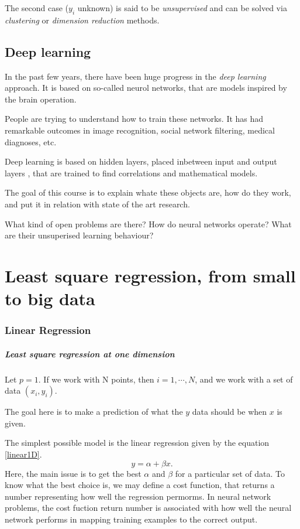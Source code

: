 \documentclass[a4paper]{tufte-book}
\begin{document}
The second case ($y_i$ unknown) is said to be \emph{unsupervised} and can be
solved via \emph{clustering} or \emph{dimension reduction} methods.

\section*{Deep learning}

In the past few years, there have been huge progress in the \emph{deep learning}
approach. It is based on so-called neurol networks, that are models inspired
by the brain operation.

People are trying to understand how to train these networks. It has had
remarkable outcomes in image recognition, social network filtering, medical
diagnoses, etc.

Deep learning is based on hidden layers, placed inbetween input and output layers
, that are trained to find correlations and mathematical models.

The goal of this course is to explain whate these objects are, how do they work,
and put it in relation with state of the art research.

What kind of open problems are there? How do neural networks operate? What are
their unsuperised learning behaviour?


\tableofcontents\thispagestyle{empty}

\mainmatter

\chapter{Least square regression, from small to big data}
\label{ch:least-square}

\subsection{Linear Regression}

\paragraph{Least square regression at one dimension}

Let $p =1$. If we work with N points, then $i=1,\cdots,N$, and we work with a
set of data $(x_i,y_i)$.

The goal here is to make a prediction of what the $y$ data should be when $x$ is
given.

The simplest possible model is the linear regression given by the equation 
\ref{linear1D}.
\begin{equation}
    y=\alpha + \beta x.
    \label{linear1D}
\end{equation}
Here, the main issue is to get the best $\alpha$ and $\beta$ for a particular set
of data. To know what the best choice is, we may define a cost function, that
returns a number representing how well the regression permorms. In neural network
problems, the cost fuction return number is associated with how well the neural
network performs in mapping training examples to the correct output.
\end{document}
